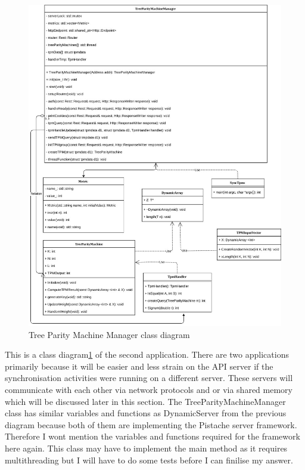 \begin{figure}[!h]
  \centering
      \includegraphics[width=1\textwidth]{Figures/TreeParityMachineManager.jpg}
  \caption[Tree Parity Machine Manager class diagram]{Tree Parity Machine Manager class diagram}
  \label{fig:tpmmanagerClassDiagram}
\end{figure}

\FloatBarrier

This is a class diagram\ref{fig:tpmmanagerClassDiagram} of the second application. There are two applications primarily because it will be easier and less strain on the API server if the synchronisation activities were running on a different server. These servers will communicate with each other via network protocols and or via shared memory which will be discussed later in this section. The TreeParityMachineManager class has similar variables and functions as DynamicServer from the previous diagram because both of them are implementing the Pistache server framework. Therefore I wont mention the variables and functions required for the framework here again. This class may have to implement the main method as it requires multithreading but I will have to do some tests before I can finilise my answer. 

